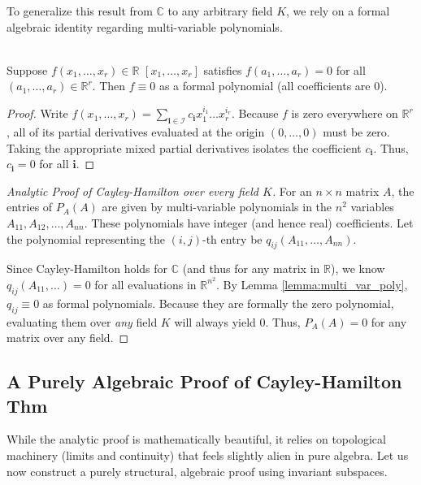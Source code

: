 To generalize this result from $\mathbb{C}$ to any arbitrary field $K$, we rely on a formal algebraic identity regarding multi-variable polynomials.

\begin{lemma}\label{lemma:multi_var_poly}
  \phantom{.} \\
  \noindent 
  Suppose $f(x_1, \dots, x_r) \in \mathbb{R}$ $[x_1, \dots, x_r]$ satisfies $f(a_1, \dots, a_r) = 0$ for all $(a_1, \dots, a_r) \in \mathbb{R}^r$. Then $f \equiv 0$ as a formal polynomial (all coefficients are 0).
\end{lemma}

\begin{proof}
  Write $f(x_1, \dots, x_r) = \sum_{\mathbf{i} \in \mathcal{I}} c_{\mathbf{i}} x_1^{i_1} \dots x_r^{i_r}$. Because $f$ is zero everywhere on $\mathbb{R}^r$, all of its partial derivatives evaluated at the origin $(0, \dots, 0)$ must be zero. Taking the appropriate mixed partial derivatives isolates the coefficient $c_{\mathbf{i}}$. Thus, $c_{\mathbf{i}} = 0$ for all $\mathbf{i}$.
\end{proof}

\begin{proof}[Analytic Proof of Cayley-Hamilton over every field $K$]
  For an $n \times n$ matrix $A$, the entries of $P_A(A)$ are given by multi-variable polynomials in the $n^2$ variables $A_{11}, A_{12}, \dots, A_{nn}$. These polynomials have integer (and hence real) coefficients. Let the polynomial representing the $(i,j)$-th entry be $q_{ij}(A_{11}, \dots, A_{nn})$.

  Since Cayley-Hamilton holds for $\mathbb{C}$ (and thus for any matrix in $\mathbb{R}$), we know $q_{ij}(A_{11}, \dots) = 0$ for all evaluations in $\mathbb{R}^{n^2}$. By Lemma \ref{lemma:multi_var_poly}, $q_{ij} \equiv 0$ as formal polynomials. Because they are formally the zero polynomial, evaluating them over \textit{any} field $K$ will always yield 0. Thus, $P_A(A) = 0$ for any matrix over any field.
\end{proof}

\subsection*{A Purely Algebraic Proof of Cayley-Hamilton Thm}

While the analytic proof is mathematically beautiful, it relies on topological machinery (limits and continuity) that feels slightly alien in pure algebra. Let us now construct a purely structural, algebraic proof using invariant subspaces.

